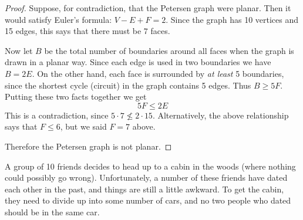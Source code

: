 \documentclass[10pt]{exam}
\begin{document}
\begin{questions}
\begin{solution}
  \begin{proof}
    Suppose, for contradiction, that the Petersen graph were planar.  Then it would satisfy Euler's formula: $V - E + F = 2$.  Since the graph has 10 vertices and 15 edges, this says that there must be $7$ faces.  
    
    Now let $B$ be the total number of boundaries around all faces when the graph is drawn in a planar way.  Since each edge is used in two boundaries we have $B = 2E$.  On the other hand, each face is surrounded by {\em at least} 5 boundaries, since the shortest cycle (circuit) in the graph contains 5 edges.  Thus $B \ge 5F$.  Putting these two facts together we get
    \[5F \le 2E\]
    This is a contradiction, since $5\cdot 7 \not\le 2\cdot 15$.  Alternatively, the above relationship says that $F \le 6$, but we said $F = 7$ above.
    
    Therefore the Petersen graph is not planar.
  \end{proof}

\end{solution}


\question[6] A group of 10 friends decides to head up to a cabin in the woods (where nothing could possibly go wrong).  Unfortunately, a number of these friends have dated each other in the past, and things are still a little awkward.  To get the cabin, they need to divide up into some number of cars, and no two people who dated should be in the same car.
\end{questions}
\end{document}
